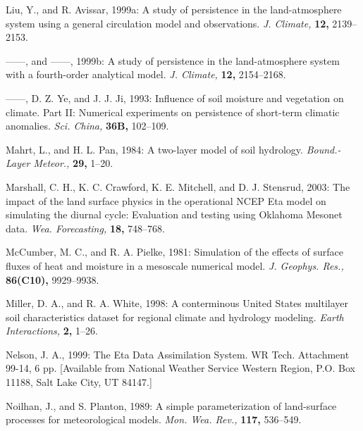 \documentclass[twocolumn]{article}
\begin{document}
\begin{references}
{\item Liu, Y., and R. Avissar, 1999a: A study of persistence in the land-atmosphere system using a general circulation model and observations. \textit{J. Climate,} \textbf{12,} 2139--2153.

\item ------, and ------, 1999b: A study of persistence in the land-atmosphere system with a fourth-order analytical model. \textit{J. Climate,} \textbf{12,} 2154--2168.

\item ------, D. Z. Ye, and J. J. Ji, 1993: Influence of soil moisture and vegetation on climate. Part II: Numerical experiments on persistence of short-term climatic anomalies. \textit{Sci. China,} \textbf{36B,} 102--109.


\item Mahrt, L., and H. L. Pan, 1984: A two-layer model of soil hydrology. \textit{Bound.-Layer Meteor.,} \textbf{29,} 1--20.

\item Marshall, C. H., K. C. Crawford, K. E. Mitchell, and D. J. Stensrud, 2003: The impact of the land surface physics in the operational NCEP Eta model on simulating the diurnal cycle: Evaluation and testing using Oklahoma Mesonet data. \textit{Wea. Forecasting,} \textbf{18,} 748--768.

\item McCumber, M. C., and R. A. Pielke, 1981: Simulation of the effects of surface fluxes of heat and moisture in a mesoscale numerical model. \textit{J. Geophys. Res.,} \textbf{86(C10),} 9929--9938.

\item Miller, D. A., and R. A. White, 1998: A conterminous United States multilayer soil characteristics dataset for regional climate and hydrology modeling. \textit{Earth Interactions,} \textbf{2,} 1--26.

\item Nelson, J. A., 1999: The Eta Data Assimilation System. WR Tech. Attachment 99-14, 6 pp. [Available from National Weather Service Western Region, P.O. Box 11188, Salt Lake City, UT 84147.]

\item Noilhan, J., and S. Planton, 1989: A simple parameterization of land-surface processes for meteorological models. \textit{Mon. Wea. Rev.,} \textbf{117,} 536--549.

}
\end{references}
\end{document}
